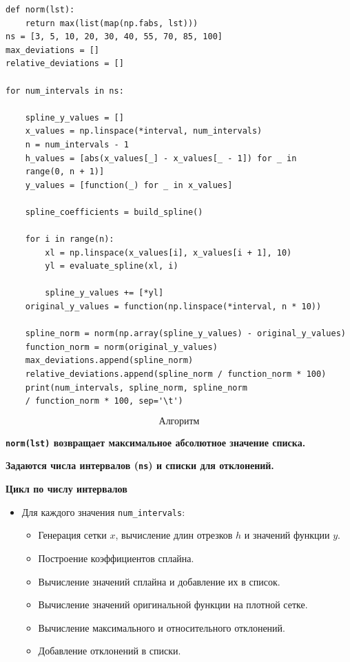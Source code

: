\documentclass{article}
\begin{document}
\begin{lstlisting}
def norm(lst):
    return max(list(map(np.fabs, lst)))
ns = [3, 5, 10, 20, 30, 40, 55, 70, 85, 100]
max_deviations = []
relative_deviations = []

for num_intervals in ns:

    spline_y_values = []
    x_values = np.linspace(*interval, num_intervals)
    n = num_intervals - 1
    h_values = [abs(x_values[_] - x_values[_ - 1]) for _ in 
    range(0, n + 1)]
    y_values = [function(_) for _ in x_values]
    
    spline_coefficients = build_spline()
    
    for i in range(n):
        xl = np.linspace(x_values[i], x_values[i + 1], 10)
        yl = evaluate_spline(xl, i)

        spline_y_values += [*yl]
    original_y_values = function(np.linspace(*interval, n * 10))

    spline_norm = norm(np.array(spline_y_values) - original_y_values)
    function_norm = norm(original_y_values)
    max_deviations.append(spline_norm)
    relative_deviations.append(spline_norm / function_norm * 100)
    print(num_intervals, spline_norm, spline_norm
    / function_norm * 100, sep='\t')

\end{lstlisting}

$$\textbf{Алгоритм}$$

\textbf{\texttt{norm(lst)} возвращает максимальное абсолютное значение списка.}

\textbf{Задаются числа интервалов (\texttt{ns}) и списки для отклонений.}

\textbf{Цикл по числу интервалов}
    \begin{itemize}
        \item Для каждого значения \texttt{num\_intervals}:
        \begin{itemize}
            \item Генерация сетки \( x \), вычисление длин отрезков \( h \) и значений функции \( y \).
            \item Построение коэффициентов сплайна.
            \item Вычисление значений сплайна и добавление их в список.
            \item Вычисление значений оригинальной функции на плотной сетке.
            \item Вычисление максимального и относительного отклонений.
            \item Добавление отклонений в списки.
        \end{itemize}
    \end{itemize}
\end{document}
